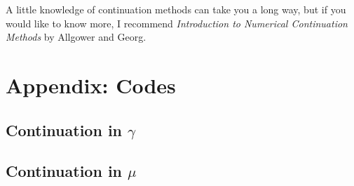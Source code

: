 \documentclass[12pt, leqno]{article} %
\begin{document}
A little knowledge of continuation methods can take you a long way,
but if you would like to know more, I recommend
{\em Introduction to Numerical Continuation Methods} by
Allgower and Georg.

\section*{Appendix: Codes}

\subsection*{Continuation in $\gamma$}



\subsection*{Continuation in $\mu$}


\end{document}
